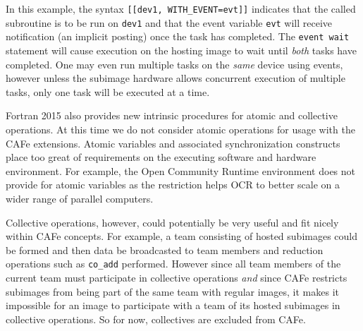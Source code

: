 In this example, the syntax \texttt{[[dev1, WITH\_EVENT=evt]]} indicates that the called
subroutine is to be run on \texttt{dev1} and that the event variable \texttt{evt} will receive
notification (an implicit posting) once the task has completed.  The \texttt{event wait}
statement will cause execution on the hosting image to wait until \emph{both} tasks have
completed.  One may even run multiple tasks on the \emph{same} device using events,
however unless the subimage hardware allows concurrent execution of multiple tasks, only
one task will be executed at a time.

Fortran 2015 also provides new intrinsic procedures for atomic and collective operations.
At this time we do not consider atomic operations for usage with the CAFe extensions.
Atomic variables and associated synchronization constructs place too great of requirements
on the executing software and hardware environment.  For example, the Open Community
Runtime environment does not provide for atomic variables as the restriction
helps OCR to better scale on a wider range of parallel computers.

Collective operations, however, could potentially be very useful and fit nicely within
CAFe concepts.  For example, a team consisting of hosted subimages could be formed and
then data be broadcasted to team members and reduction operations such as \texttt{co\_add}
performed.  However since all team members of the current team must participate in
collective operations \emph{and} since CAFe restricts subimages from being part of the
same team with regular images, it makes it impossible for an image to participate with a
team of its hosted subimages in collective operations.  So for now, collectives are
excluded from CAFe.
